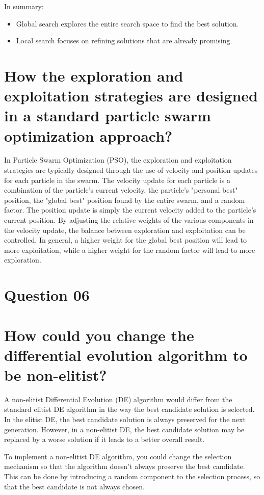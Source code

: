 \documentclass[conference]{IEEEtran}
\begin{document}
In summary:
\begin{itemize}
	\item Global search explores the entire search space to find the best solution.
	\item Local search focuses on refining solutions that are already promising.
\end{itemize}


\section{How the exploration and exploitation strategies are designed in a standard particle swarm optimization approach?}

In Particle Swarm Optimization (PSO), the exploration and exploitation strategies are typically designed through the use of velocity and position updates for each particle in the swarm. The velocity update for each particle is a combination of the particle's current velocity, the particle's "personal best" position, the "global best" position found by the entire swarm, and a random factor. The position update is simply the current velocity added to the particle's current position. By adjusting the relative weights of the various components in the velocity update, the balance between exploration and exploitation can be controlled. In general, a higher weight for the global best position will lead to more exploitation, while a higher weight for the random factor will lead to more exploration.

\section{Question 06}

\section{How could you change the differential evolution algorithm to be non-elitist?}

A non-elitist Differential Evolution (DE) algorithm would differ from the standard elitist DE algorithm in the way the best candidate solution is selected. In the elitist DE, the best candidate solution is always preserved for the next generation. However, in a non-elitist DE, the best candidate solution may be replaced by a worse solution if it leads to a better overall result.

To implement a non-elitist DE algorithm, you could change the selection mechanism so that the algorithm doesn't always preserve the best candidate. This can be done by introducing a random component to the selection process, so that the best candidate is not always chosen.
\end{document}
